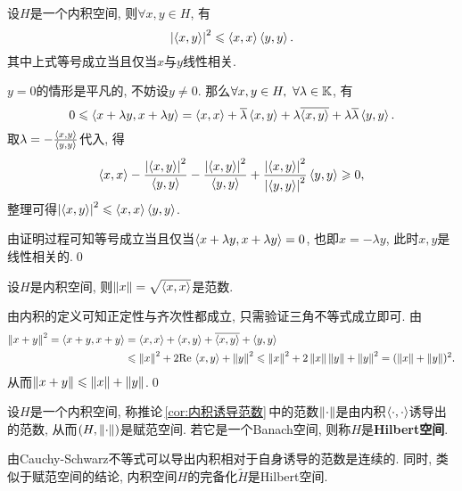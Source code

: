 	\begin{Theorem}
	设$ H $是一个内积空间, 则$ \forall x,y\in H $, 有
	\[
	\left| \left\langle x,y \right\rangle \right| ^2\leqslant\left\langle x,x \right\rangle\left\langle y,y \right\rangle.
	\]
	其中上式等号成立当且仅当$ x $与$ y $线性相关.
	\end{Theorem}
	\begin{Proof}
	$ y=0 $的情形是平凡的, 不妨设$ y\ne 0 $. 那么$ \forall x,y\in H,\ \forall\lambda\in\K $, 有
	\[
	0\leqslant\left\langle x+\lambda y,x+\lambda y \right\rangle=\left\langle x,x \right\rangle+\overline{\lambda}\left\langle x,y \right\rangle+\lambda\overline{\left\langle x,y \right\rangle}+\lambda\overline{\lambda}\left\langle y,y \right\rangle.
	\]
	取$ \lambda=-\frac{\left\langle x,y \right\rangle}{\left\langle y,y \right\rangle} $代入, 得
	\[
	\left\langle x,x \right\rangle-\frac{\left| \left\langle x,y \right\rangle \right| ^2}{\left\langle y,y \right\rangle}-\frac{\left| \left\langle x,y \right\rangle \right| ^2}{\left\langle y,y \right\rangle}+\frac{\left| \left\langle x,y \right\rangle \right| ^2}{\left| \left\langle y,y \right\rangle \right| ^2}\left\langle y,y \right\rangle\geqslant 0,
	\]
	整理可得$ \left| \left\langle x,y \right\rangle \right| ^2\leqslant\left\langle x,x \right\rangle\left\langle y,y \right\rangle $.
	
	由证明过程可知等号成立当且仅当$ \left\langle x+\lambda y,x+\lambda y \right\rangle=0 $, 也即$ x=-\lambda y $, 此时$ x,y $是线性相关的.\qed
	\end{Proof}
	
	\begin{Corollary}\label{cor:内积诱导范数}
	设$ H $是内积空间, 则$ \left\| x \right\|=\sqrt{\left\langle x,x \right\rangle} $是范数.
	\end{Corollary}
	\begin{Proof}
	由内积的定义可知正定性与齐次性都成立, 只需验证三角不等式成立即可. 由
	\[
		\begin{aligned}
		\left\| x+y \right\|^2=\left\langle x+y,x+y \right\rangle&=\left\langle x,x \right\rangle+\left\langle x,y \right\rangle+\overline{\left\langle x,y \right\rangle}+\left\langle y,y \right\rangle\\
		&\leqslant\left\| x \right\|^2+2\mathrm{Re\,}\left\langle x,y \right\rangle+\left\| y \right\|^2\leqslant\left\| x \right\|^2+2\left\| x \right\|\left\| y \right\|+\left\| y \right\|^2=(\left\| x \right\|+\left\| y \right\|)^2.
		\end{aligned}
	\]
	从而$ \left\| x+y \right\|\leqslant\left\| x \right\|+\left\| y \right\| $.\qed
	\end{Proof}
	
	\begin{Definition}[Hilbert空间]\label{def:Hilbert空间}
	设$ H $是一个内积空间, 称推论\,\ref{cor:内积诱导范数}\,中的范数$ \left\| \cdot \right\| $是由内积$ \left\langle \cdot,\cdot \right\rangle $诱导出的范数, 从而$ (H,\left\| \cdot \right\|) $是赋范空间. 若它是一个Banach空间, 则称$ H $是\textbf{Hilbert空间}.
	\end{Definition}
	
	由Cauchy-Schwarz不等式可以导出内积相对于自身诱导的范数是连续的. 同时, 类似于赋范空间的结论, 内积空间$ H $的完备化$ \tilde{H} $是Hilbert空间.
	
